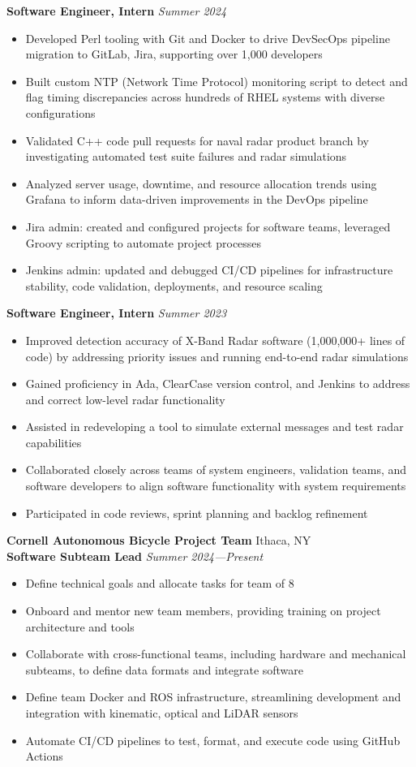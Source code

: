 \documentclass[letterpaper,10pt]{article}
\newcommand{\company}[2]{
    \vspace{6pt}
    {\large \textbf{#1}}
    \hfill
    {\normalsize {#2}}
    \\
}
\newcommand{\position}[2]{
    \vspace{4pt}
    {\normalsize \textbf {#1}}
    \hfill
    {\normalsize \textit{#2}}
    \\
}
\newcommand{\itemsBegin}{
    \begin{itemize}[leftmargin=0.2in, labelsep=0.05in, itemsep=0pt, parsep=1pt, topsep=0pt, partopsep=0pt]
}
\newcommand{\itemsEnd}{\end{itemize}}
\begin{document}
    \position{Software Engineer, Intern}{Summer 2024}
    \itemsBegin{}
        \item Developed Perl tooling with Git and Docker to drive DevSecOps pipeline migration to GitLab, Jira, supporting over 1,000 developers
        \item Built custom NTP (Network Time Protocol) monitoring script to detect and flag timing discrepancies across hundreds of RHEL systems with diverse configurations
        \item Validated C++ code pull requests for naval radar product branch by investigating automated test suite failures and radar simulations
        \item Analyzed server usage, downtime, and resource allocation trends using Grafana to inform data-driven improvements in the DevOps pipeline
        \item Jira admin: created and configured projects for software teams, leveraged Groovy scripting to automate project processes
        \item Jenkins admin: updated and debugged CI/CD pipelines for infrastructure stability, code validation, deployments, and resource scaling
    \itemsEnd{}

    \position{Software Engineer, Intern}{Summer 2023}
    \itemsBegin{}
        \item Improved detection accuracy of X-Band Radar software (1,000,000+ lines of code) by addressing priority issues and running end-to-end radar simulations
        \item Gained proficiency in Ada, ClearCase version control, and Jenkins to address and correct low-level radar functionality
        \item Assisted in redeveloping a tool to simulate external messages and test radar capabilities
        \item Collaborated closely across teams of system engineers, validation teams, and software developers to align software functionality with system requirements
        \item Participated in code reviews, sprint planning and backlog refinement
    \itemsEnd{}

    \company{Cornell Autonomous Bicycle Project Team}{Ithaca, NY}

    \position{Software Subteam Lead}{Summer 2024---Present}
    \itemsBegin{}
        \item Define technical goals and allocate tasks for team of 8
        \item Onboard and mentor new team members, providing training on project architecture and tools
        \item Collaborate with cross-functional teams, including hardware and mechanical subteams, to define data formats and integrate software
        \item Define team Docker and ROS infrastructure, streamlining development and integration with kinematic, optical and LiDAR sensors
        \item Automate CI/CD pipelines to test, format, and execute code using GitHub Actions
    \itemsEnd{}
\end{document}
